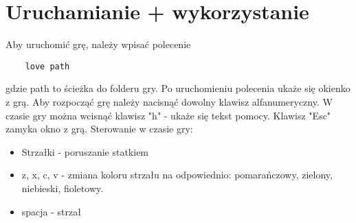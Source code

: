 \documentclass{article}
\begin{document}
    \section{Uruchamianie + wykorzystanie}
    Aby uruchomić grę, należy wpisać polecenie 
    \begin{lstlisting}
    love path
    \end{lstlisting}
    gdzie path to ścieżka do folderu gry.
    Po uruchomieniu polecenia ukaże się okienko z grą. Aby rozpocząć grę należy nacisnąć dowolny klawisz alfanumeryczny. W czasie gry można wcisnąć klawisz "h" - ukaże się tekst pomocy. Klawisz "Esc" zamyka okno z grą. 
    Sterowanie w czasie gry: 
    \begin{itemize}
    \item Strzałki - poruszanie statkiem
    \item z, x, c, v - zmiana koloru strzału na odpowiednio: pomarańczowy, zielony, niebieski, fioletowy.
    \item spacja - strzał
    \end{itemize}
    
    
    
\end{document}
